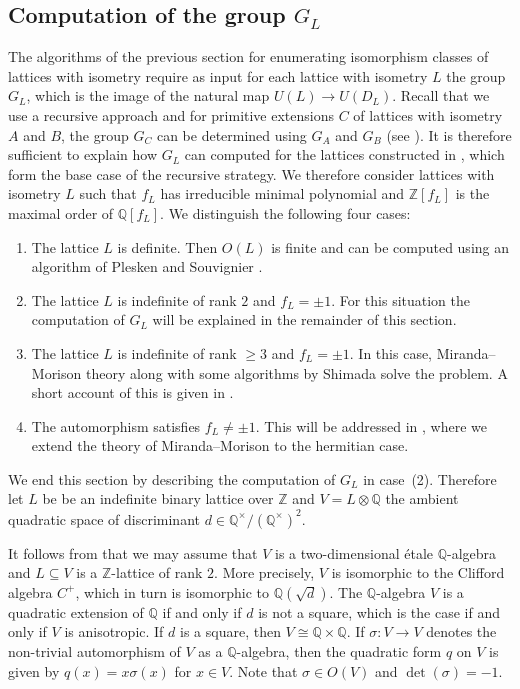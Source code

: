 \documentclass[a4paper]{amsart}
\theoremstyle{definition}
\theoremstyle{plain}
\newcommand{\QQ}{\mathbb{Q}}
\newcommand{\ZZ}{\mathbb{Z}}
\begin{document}
\subsection{Computation of the group $G_L$}\label{subsec:computeGL}
The algorithms of the previous section for enumerating isomorphism classes of lattices with isometry
require as input for each lattice with isometry $L$ the group $G_L$, which is the image of
the natural map $U(L) \to U(D_L)$. Recall that we use a recursive approach 
and for primitive extensions $C$ of lattices with isometry $A$ and $B$, the group
$G_C$ can be determined using $G_A$ and $G_B$ (see ). It is therefore sufficient to explain how $G_L$ can computed for the lattices constructed in , which form the base case of the recursive strategy.
We therefore consider lattices with isometry $L$ such that $f_L$ has irreducible minimal polynomial and $\ZZ[f_L]$ is the maximal order of $\QQ[f_L]$.
We distinguish the following four cases:

\begin{enumerate}
  \item
    The lattice $L$ is definite. Then $O(L)$ is finite and can be computed using an algorithm of Plesken and Souvignier \cite{Plesken-Souvignier}.
  \item
    The lattice $L$ is indefinite of rank $2$ and $f_L = \pm 1$. For this situation the computation of $G_L$ will be explained in the remainder of this section.
  \item
    The lattice $L$ is indefinite of rank $\geq 3$ and $f_L = \pm 1$. In this case, Miranda--Morison theory \cite{miranda-morrisonI, miranda-morrisonII} along with some algorithms by Shimada \cite{shimada2018} solve the problem.
    A short account of this is given in .
  \item
    The automorphism satisfies $f_L \neq \pm 1$. This will be addressed in ,
    where we extend the theory of Miranda--Morison to the hermitian case.
\end{enumerate}

%

We end this section by describing the computation of $G_L$ in case~(2).
Therefore let $L$ be be an indefinite binary lattice over $\ZZ$ and $V = L \otimes \QQ$ the ambient quadratic space of discriminant $d \in \QQ^\times/(\QQ^\times)^2$.

It follows from \cite[\S 5]{Eichler1974} that we may assume that $V$ is a two-dimensional étale $\QQ$-algebra and $L \subseteq V$ is a $\ZZ$-lattice of rank $2$.
More precisely, $V$ is isomorphic to the Clifford algebra $C^+$, which in turn is isomorphic to $\QQ(\sqrt{d})$. The $\QQ$-algebra $V$ is a quadratic extension of $\QQ$ if and only if $d$ is not a square, which is the case if and only if $V$ is anisotropic. If $d$ is a square, then $V \cong \QQ \times \QQ$.
If $\sigma \colon V \to V$ denotes the non-trivial automorphism of $V$ as a $\QQ$-algebra,
then the quadratic form $q$ on $V$ is given by $q(x) = x \sigma(x)$ for $x \in V$.
Note that $\sigma \in O(V)$ and $\det(\sigma) = -1$.
\end{document}
